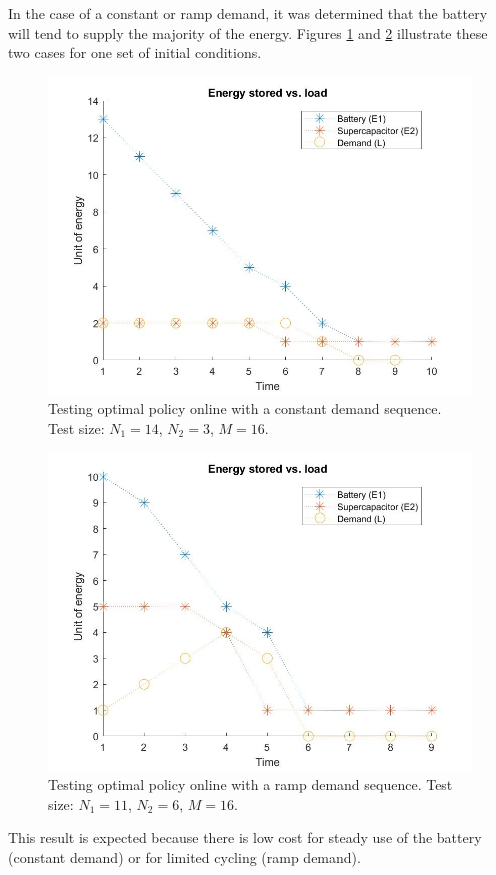 \documentclass[conference]{IEEEtran}
\begin{document}
In the case of a constant or ramp demand, it was determined that the battery will tend to supply the majority of the energy. Figures \ref{fig:ConstDemand} and \ref{fig:RampDemand} illustrate these two cases for one set of initial conditions.
\begin{figure}[htbp]
\centerline{\includegraphics[scale=0.25]{EnergyStoredvsload_ConstantLoad(E1_max=13,E2_max=2).jpg}}
\caption{Testing optimal policy online with a constant demand sequence. Test size: $N_{1}=14$, $N_{2}=3$, $M=16$.}
\label{fig:ConstDemand}
\end{figure}
\begin{figure}[htbp]
\centerline{\includegraphics[scale=0.25]{EnergyStoredvsload_RampLoad(E1_max=10,E2_max=5).jpg}}
\caption{Testing optimal policy online with a ramp demand sequence. Test size: $N_{1}=11$, $N_{2}=6$, $M=16$.}
\label{fig:RampDemand}
\end{figure} This result is expected because there is low cost for steady use of the battery (constant demand) or for limited cycling (ramp demand).
\end{document}
